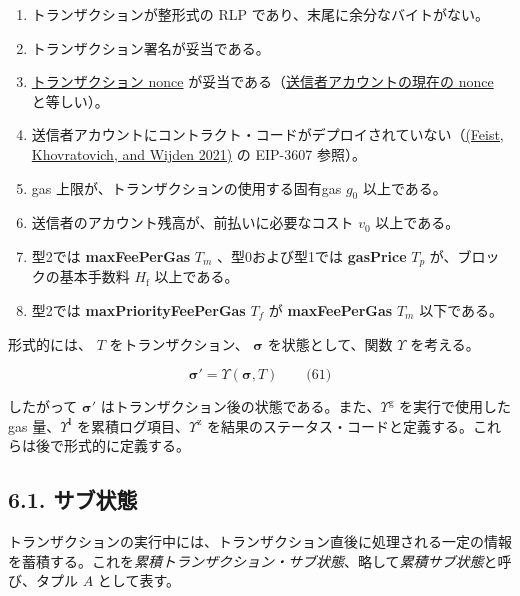 \documentclass[
]{ltjsarticle}
\begin{document}
\begin{enumerate}
\def\labelenumi{\arabic{enumi}.}
\item
  トランザクションが整形式の RLP であり、末尾に余分なバイトがない。
\item
  トランザクション署名が妥当である。
\item
  \protect\hyperlink{transaction_nonce}{トランザクション nonce}
  が妥当である（\protect\hyperlink{account_nonce}{送信者アカウントの現在の
  nonce} と等しい）。
\item
  送信者アカウントにコントラクト・コードがデプロイされていない（\protect\hyperlink{ref-EIP-3607}{(Feist,
  Khovratovich, and Wijden 2021)} の EIP-3607 参照）。
\item
  gas 上限が、トランザクションの使用する固有gas \(g_0\) 以上である。
\item
  送信者のアカウント残高が、前払いに必要なコスト \(v_0\) 以上である。
\item
  型2では \textbf{maxFeePerGas} \(T_m\) 、型0および型1では
  \textbf{gasPrice} \(T_p\) が、ブロックの基本手数料 \(H_{\mathrm{f}}\)
  以上である。
\item
  型2では \textbf{maxPriorityFeePerGas} \(T_f\) が \textbf{maxFeePerGas}
  \(T_m\) 以下である。
\end{enumerate}

形式的には、 \(T\) をトランザクション、 \(\boldsymbol{\sigma}\)
を状態として、関数
\protect\hyperlink{Upsilon_state_transition}{\(\Upsilon\)} を考える。

\protect\hypertarget{eq-61}{}{}

\[\boldsymbol{\sigma}' = \Upsilon(\boldsymbol{\sigma}, T) \qquad \text{(61)}\]

したがって \(\boldsymbol{\sigma}'\)
はトランザクション後の状態である。また、\protect\hyperlink{tx_total_gas_used_Upsilon_pow_g}{\(\Upsilon^{\mathrm{g}}\)}
を実行で使用した gas
量、\protect\hyperlink{tx_logs_Upsilon_pow_l}{\(\Upsilon^{\mathbf{l}}\)}
を累積ログ項目、\protect\hyperlink{tx_status_Upsilon_pow_z}{\(\Upsilon^{\mathrm{z}}\)}
を結果のステータス・コードと定義する。これらは後で形式的に定義する。

\protect\hypertarget{ch:substate}{}{}

\hypertarget{ux30b5ux30d6ux72b6ux614b}{%
\subsection{6.1. サブ状態}\label{ux30b5ux30d6ux72b6ux614b}}

トランザクションの実行中には、トランザクション直後に処理される一定の情報を蓄積する。これを\emph{累積トランザクション・サブ状態}、略して\emph{累積サブ状態}と呼び、タプル
\(A\) として表す。
\end{document}
